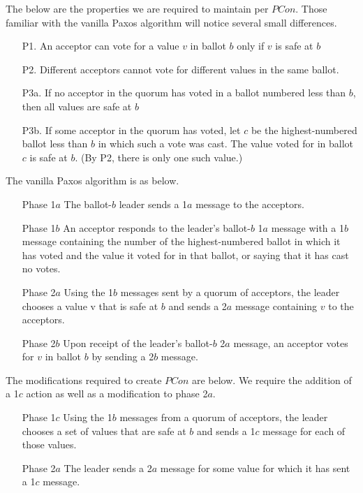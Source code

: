 \documentclass[conference]{IEEEtran}
\begin{document}
The below are the properties we are required to maintain per $PCon$. Those familiar with the vanilla Paxos algorithm will notice several small differences.
\smallskip
\begin{enumerate}[leftmargin=4em]
\item[P1.] An acceptor can vote for a value $v$ in ballot $b$ only if $v$ is safe at $b$
\item[P2.] Different acceptors cannot vote for different values in the same ballot.
\item[P3a.] If no acceptor in the quorum has voted in a ballot numbered less than $b$, then all values are safe at $b$
\item[P3b.] If some acceptor in the quorum has voted, let $c$ be the highest-numbered ballot less than $b$ in which such a vote was cast. The value voted for in ballot $c$ is safe at $b$. (By P2, there is only one such value.)
\end{enumerate}
\smallskip
The vanilla Paxos algorithm is as below.
\smallskip

\begin{enumerate}[leftmargin=5em]
\item[Phase 1$a$] The ballot-$b$ leader sends a 1$a$ message to the acceptors.
\item[Phase 1$b$] An acceptor responds to the leader’s ballot-$b$ 1$a$ message with a 1$b$ message containing the number of the highest-numbered ballot in which it has voted and the value it voted for in that ballot, or saying that it has cast no votes.
\end{enumerate}
\smallskip

\begin{enumerate}[leftmargin=5em]
\item[Phase 2$a$] Using the 1$b$ messages sent by a quorum of acceptors, the leader chooses a value v that is safe at $b$ and sends a 2$a$ message containing $v$ to the acceptors.
\item[Phase 2$b$] Upon receipt of the leader’s ballot-$b$ 2$a$ message, an acceptor votes for $v$ in ballot $b$ by sending a 2$b$ message.
\end{enumerate}
\smallskip
The modifications required to create $PCon$ are below. We require the addition of a 1$c$ action as well as a modification to phase 2$a$.
\smallskip

\begin{enumerate}[leftmargin=5em]
\item[Phase 1$c$] Using the 1$b$ messages from a quorum of acceptors, the leader chooses a set of values that are safe at $b$ and sends a 1$c$ message for each of those values.
\item[Phase 2$a$] The leader sends a 2$a$ message for some value for which it has sent a 1$c$ message.
\end{enumerate}
\smallskip
\end{document}
